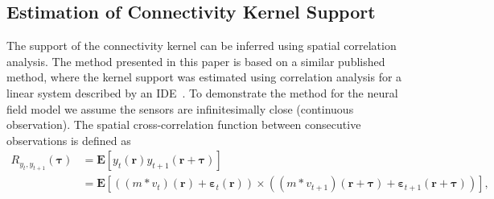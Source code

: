 \documentclass[]{article}
\begin{document}
\renewcommand{\theequation}{S1.\arabic{equation}}


\subsection*{Estimation of Connectivity Kernel Support}
The support of the connectivity kernel can be inferred using spatial correlation analysis. The method presented in this paper is based on a similar published method, where the kernel support was estimated using correlation analysis for a linear system described by an IDE~\cite{Scerri2009}. To demonstrate the method for the neural field model we assume the sensors are infinitesimally close (continuous observation). The spatial cross-correlation function between consecutive observations is defined as 
\begin{align}
	R_{y_{t},y_{t+1}}(\boldsymbol{\tau}) &= \mathbf{E}\left[ y_{t}\left(\mathbf{r}\right) y_{t+1}\left(\mathbf{r}+\boldsymbol{\tau}\right) \right] \\
	&= \mathbf{E}\left[\left(\left(m\ast v_t\right)\left(\mathbf{r}\right) + \boldsymbol{\varepsilon}_t\left(\mathbf{r}\right) \right) \times \left(\left( m \ast v_{t+1}\right)\left(\mathbf{r}+\boldsymbol{\tau}\right)+ \boldsymbol{\varepsilon}_{t+1}\left(\mathbf{r}+\boldsymbol{\tau}\right)\right) \right], \label{eq:ObsXCorr}
\end{align}
\end{document}
